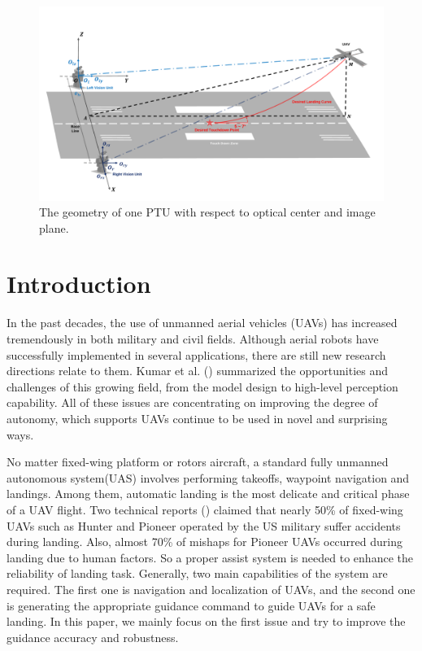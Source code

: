 \begin{figure}[!tb]
	\centering
	\includegraphics[width=\textwidth]{Figs/Fig04_GeneralSystem.pdf}
	\caption{The geometry of one PTU with respect to optical center and image plane.}
	\label{fig:Fig04_GeneralSystem}
\end{figure}

\section{Introduction}
\label{intro}
In the past decades, the use of unmanned aerial vehicles (UAVs) has increased tremendously in both military and civil fields. Although aerial robots have successfully implemented in several applications, there are still new research directions relate to them. Kumar et al. (\cite{kumar2012opportunities}) summarized the opportunities and challenges of this growing field, from the model design to high-level perception capability. All of these issues are concentrating on improving the degree of autonomy, which supports UAVs continue to be used in novel and surprising ways.

No matter fixed-wing platform or rotors aircraft, a standard fully unmanned autonomous system(UAS) involves performing takeoffs, waypoint navigation and landings. Among them, automatic landing is the most delicate and critical phase of a UAV flight. Two technical reports (\cite{williams2004summary,manning2004role}) claimed that nearly 50\% of fixed-wing UAVs such as Hunter and Pioneer operated by the US military suffer accidents during landing. Also, almost 70\% of mishaps for Pioneer UAVs occurred during landing due to human factors. So a proper assist system is needed to enhance the reliability of landing task. Generally, two main capabilities of the system are required. The first one is navigation and localization of UAVs, and the second one is generating the appropriate guidance command to guide UAVs for a safe landing. In this paper, we mainly focus on the first issue and try to improve the guidance accuracy and robustness.


